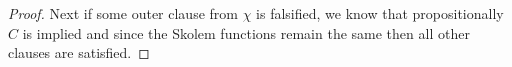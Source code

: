 \documentclass[runningheads]{llncs}
\begin{document}
\begin{proof}
	Next if some outer clause from $\chi$ is falsified, we know that propositionally $C$ is implied and since the Skolem functions remain the same then all other clauses are satisfied.
	
	
	
	
\end{proof}	
\end{document}
